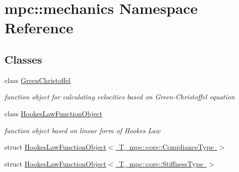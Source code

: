 \hypertarget{namespacempc_1_1mechanics}{}\section{mpc\+:\+:mechanics Namespace Reference}
\label{namespacempc_1_1mechanics}
\subsection*{Classes}
\begin{DoxyCompactItemize}
\item 
class \mbox{\hyperlink{structmpc_1_1mechanics_1_1_green_christoffel}{Green\+Christoffel}}
\begin{DoxyCompactList}\small\item\em function object for calculating velocities based on Green-\/\+Christoffel equation \end{DoxyCompactList}\item 
class \mbox{\hyperlink{structmpc_1_1mechanics_1_1_hookes_law_function_object}{Hookes\+Law\+Function\+Object}}
\begin{DoxyCompactList}\small\item\em function object based on linear form of Hooke\textquotesingle{}s Law \end{DoxyCompactList}\item 
struct \mbox{\hyperlink{structmpc_1_1mechanics_1_1_hookes_law_function_object_3_01_t_00_01mpc_1_1core_1_1_compliance_type_01_4}{Hookes\+Law\+Function\+Object$<$ T, mpc\+::core\+::\+Compliance\+Type $>$}}
\item 
struct \mbox{\hyperlink{structmpc_1_1mechanics_1_1_hookes_law_function_object_3_01_t_00_01mpc_1_1core_1_1_stiffness_type_01_4}{Hookes\+Law\+Function\+Object$<$ T, mpc\+::core\+::\+Stiffness\+Type $>$}}
\end{DoxyCompactItemize}
